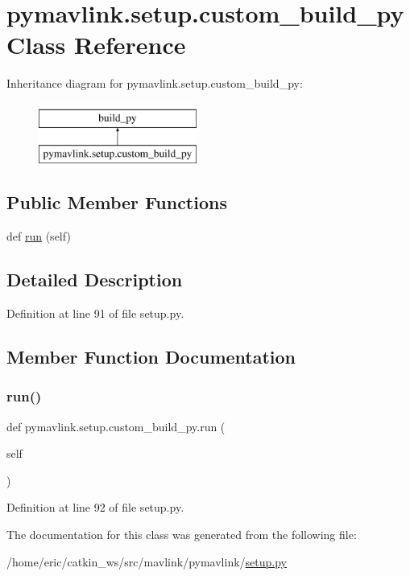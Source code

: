 \hypertarget{classpymavlink_1_1setup_1_1custom__build__py}{}\section{pymavlink.\+setup.\+custom\+\_\+build\+\_\+py Class Reference}
\label{classpymavlink_1_1setup_1_1custom__build__py}
Inheritance diagram for pymavlink.\+setup.\+custom\+\_\+build\+\_\+py\+:\begin{figure}[H]
\begin{center}
\leavevmode
\includegraphics[height=2.000000cm]{classpymavlink_1_1setup_1_1custom__build__py}
\end{center}
\end{figure}
\subsection*{Public Member Functions}
\begin{DoxyCompactItemize}
\item 
def \mbox{\hyperlink{classpymavlink_1_1setup_1_1custom__build__py_acdc73ef2274a81288bb002d614fab3b6}{run}} (self)
\end{DoxyCompactItemize}


\subsection{Detailed Description}


Definition at line 91 of file setup.\+py.



\subsection{Member Function Documentation}
\mbox{\label{classpymavlink_1_1setup_1_1custom__build__py_acdc73ef2274a81288bb002d614fab3b6}} 
\subsubsection{\texorpdfstring{run()}{run()}}
{\footnotesize\ttfamily def pymavlink.\+setup.\+custom\+\_\+build\+\_\+py.\+run (\begin{DoxyParamCaption}\item[{}]{self }\end{DoxyParamCaption})}



Definition at line 92 of file setup.\+py.



The documentation for this class was generated from the following file\+:\begin{DoxyCompactItemize}
\item 
/home/eric/catkin\+\_\+ws/src/mavlink/pymavlink/\mbox{\hyperlink{mavlink_2pymavlink_2setup_8py}{setup.\+py}}\end{DoxyCompactItemize}
